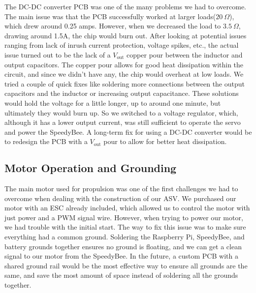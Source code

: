 The DC-DC converter PCB was one of the many problems we had to overcome. The main issue was that the PCB successfully worked at larger loads($20~\Omega$), which drew around 0.25 amps. However, when we decreased the load to $3.5~\Omega$, drawing around 1.5A, the chip would burn out. After looking at potential issues ranging from lack of inrush current protection, voltage spikes, etc., the actual issue turned out to be the lack of a \(V_{\text{out}}\) copper pour between the inductor and output capacitors. The copper pour allows for good heat dissipation within the circuit, and since we didn't have any, the chip would overheat at low loads. We tried a couple of quick fixes like soldering more connections between the output capacitors and the inductor or increasing output capacitance. These solutions would hold the voltage for a little longer, up to around one minute, but ultimately they would burn up. So we switched to a voltage regulator, which, although it has a lower output current, was still sufficient to operate the servo and power the SpeedyBee. A long-term fix for using a DC-DC converter would be to redesign the PCB with a \(V_{\text{out}}\) pour to allow for better heat dissipation.
\subsection{Motor Operation and Grounding}
The main motor used for propulsion was one of the first challenges we had to overcome when dealing with the construction of our ASV. We purchased our motor with an ESC already included, which allowed us to control the motor with just power and a PWM signal wire. However, when trying to power our motor, we had trouble with the initial start. The way to fix this issue was to make sure everything had a common ground. Soldering the Raspberry Pi, SpeedyBee, and battery grounds together ensures no ground is floating, and we can get a clean signal to our motor from the SpeedyBee. In the future, a custom PCB with a shared ground rail would be the most effective way to ensure all grounds are the same, and save the most amount of space instead of soldering all the grounds together. 
